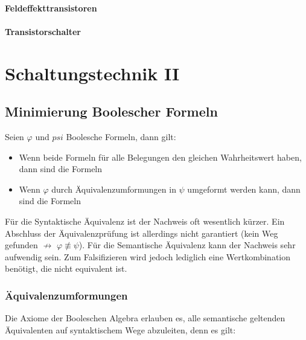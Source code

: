 \documentclass[12pt]{report}
\begin{document}
\subsubsection{Feldeffekttransistoren}

\subsubsection{Transistorschalter}




\chapter{Schaltungstechnik II}
\section{Minimierung Boolescher Formeln}
\begin{defbox}
  Seien $\varphi$ und $psi$ Boolesche Formeln, dann gilt:

  \begin{itemize}
    \item Wenn beide Formeln für alle Belegungen den gleichen Wahrheitswert haben, dann sind die Formeln



    \item Wenn $\varphi$ durch Äquivalenzumformungen in $\psi$ umgeformt werden kann, dann sind die Formeln

  \end{itemize}
\end{defbox}

Für die Syntaktische Äquivalenz ist der Nachweis oft wesentlich kürzer. Ein Abschluss der Äquivalenzprüfung ist allerdings nicht garantiert (kein Weg gefunden $\not \rightarrow$ $\varphi \not \equiv \psi$).
Für die Semantische Äquivalenz kann der Nachweis sehr aufwendig sein. Zum Falsifizieren wird jedoch lediglich eine Wertkombination benötigt, die nicht equivalent ist.

\subsection{Äquivalenzumformungen}
Die Axiome der Booleschen Algebra erlauben es, alle semantische geltenden Äquivalenten auf syntaktischem Wege abzuleiten, denn es gilt:
\end{document}
